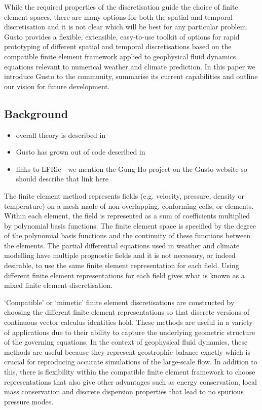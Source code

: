 \documentclass[journal abbreviation, manuscript]{copernicus}
\begin{document}
While the required properties of the discretisation guide the choice
of finite element spaces, there are many options for both the spatial
and temporal discretisation and it is not clear which will be best for
any particular problem. Gusto provides a flexible, extensible,
easy-to-use toolkit of options for rapid prototyping of different
spatial and temporal discretisations based on the compatible finite
element framework applied to geophysical fluid dynamics equations
relevant to numerical weather and climate prediction. In this paper we
introduce Gusto to the community, summarise its current capabilities
and outline our vision for future development.

\subsection{Background}

\begin{itemize}
\item overall theory is described in \citet{gibson2019compatible, cotter2023compatible}
\item Gusto has grown out of code described in \citet{natale2016compatible, cotter2012mixed, bendall2019recovered, bendall2020compatible, yamazaki2017vertical, shipton2018higher}
\item links to LFRic - we mention the Gung Ho project on the Gusto website so should describe that link here
\end{itemize}

The finite element method represents fields (e.g. velocity, pressure,
density or temperature) on a mesh made of non-overlapping, conforming
cells, or elements. Within each element, the field is represented as a
sum of coefficients multiplied by polynomial basis functions. The
finite element space is specified by the degree of the polynomial
basis functions and the continuity of these functions between the
elements. The partial differential equations used in weather and
climate modelling have multiple prognostic fields and it is not
necessary, or indeed desirable, to use the same finite element
representation for each field. Using different finite element
representations for each field gives what is known as a mixed finite
element discretisation.

`Compatible' or `mimetic' finite element discretisations are
constructed by choosing the different finite element representations
so that discrete versions of continuous vector calculus identities
hold. These methods are useful in a variety of applications due to
their ability to capture the underlying geometric structure of the
governing equations. In the context of geophysical fluid dynamics,
these methods are useful because they represent geostrophic balance
exactly which is crucial for reproducing accurate simulations of the
large-scale flow. In addition to this, there is flexibility within the
compatible finite element framework to choose representations that
also give other advantages such as energy conservation, local mass
conservation and discrete dispersion properties that lead to no
spurious pressure modes.
\end{document}
